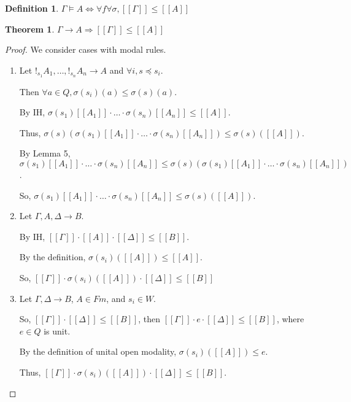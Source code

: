 \documentclass[a4paper]{article}
\newtheorem{theorem}{Theorem}
\newtheorem{defin}{Definition}
\begin{document}
\begin{defin}
  $\Gamma \models A \Leftrightarrow \forall f \forall \sigma, [\![\Gamma]\!] \leq [\![A]\!]$
\end{defin}

\begin{theorem}
  $\Gamma \rightarrow A \Rightarrow [\![\Gamma]\!] \leq [\![A]\!]$
\end{theorem}

\begin{proof}
We consider cases with modal rules.

\begin{enumerate}

\item Let $!_{s_1} A_1, \dots, !_{s_n} A_n \rightarrow A$ and $\forall i, s \preceq s_i$.

Then $\forall a \in Q, \sigma(s_i)(a) \leq \sigma(s)(a)$.

By IH, $\sigma(s_1)[\![A_1]\!] \cdot \dots \cdot \sigma(s_n) [\![A_n]\!] \leq [\![A]\!]$.

Thus, $\sigma(s)(\sigma(s_1)[\![A_1]\!] \cdot \dots \cdot \sigma(s_n) [\![A_n]\!]) \leq \sigma(s)([\![A]\!])$.

By Lemma 5, $\sigma(s_1)[\![A_1]\!] \cdot \dots \cdot \sigma(s_n) [\![A_n]\!] \leq \sigma(s)(\sigma(s_1)[\![A_1]\!] \cdot \dots \cdot \sigma(s_n) [\![A_n]\!])$.

So, $\sigma(s_1)[\![A_1]\!] \cdot \dots \cdot \sigma(s_n) [\![A_n]\!] \leq \sigma(s)([\![A]\!])$.

\item Let $\Gamma, A, \Delta \rightarrow B$.

By IH, $[\![\Gamma]\!] \cdot [\![A]\!] \cdot [\![\Delta]\!] \leq [\![B]\!]$.

By the definition, $\sigma(s_i)([\![A]\!]) \leq [\![A]\!]$.

So, $[\![\Gamma]\!] \cdot \sigma(s_i)([\![A]\!]) \cdot [\![\Delta]\!] \leq [\![B]\!]$

\item Let $\Gamma, \Delta \rightarrow B$, $A \in Fm$, and $s_i \in W$.

So, $[\![\Gamma]\!] \cdot [\![\Delta]\!] \leq [\![B]\!]$,
then $[\![\Gamma]\!] \cdot e \cdot [\![\Delta]\!] \leq [\![B]\!]$, where $e \in Q$ is unit.

By the definition of unital open modality, $\sigma(s_i)([\![A]\!]) \leq e$.

Thus, $[\![\Gamma]\!] \cdot \sigma(s_i)([\![A]\!]) \cdot [\![\Delta]\!] \leq [\![B]\!]$.


\end{enumerate}
\end{proof}
\end{document}
